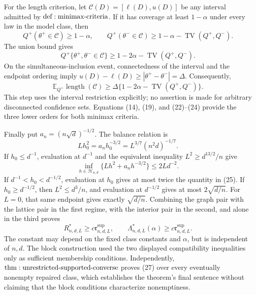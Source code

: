 For the length criterion, let \(\mathcal C(D)=[\ell(D),u(D)]\) be any interval admitted by \({\rm def:minimax\text{-}criteria}\).  If it has coverage at least \(1-\alpha\) under every law in the model class, then
\[
 Q^+(\theta^+\in\mathcal C)\geq1-\alpha,
 \qquad
 Q^+(\theta^-\in\mathcal C)
 \geq1-\alpha-\operatorname{TV}(Q^+,Q^-).
\]
The union bound gives
\[
 Q^+\{\theta^+,\theta^-\in\mathcal C\}
 \geq1-2\alpha-\operatorname{TV}(Q^+,Q^-).
\]
On the simultaneous-inclusion event, connectedness of the interval and the endpoint ordering imply \(u(D)-\ell(D)\geq|\theta^+-\theta^-|=\Delta\).  Consequently,
\[
 \mathbb E_{Q^+}\operatorname{length}(\mathcal C)
 \geq\Delta\{1-2\alpha-\operatorname{TV}(Q^+,Q^-)\}.
\tag{24}
\]
This step uses the interval restriction explicitly; no assertion is made for arbitrary disconnected confidence sets.  Equations (14), (19), and (22)--(24) provide the three lower orders for both minimax criteria.

Finally put \(a_n=(n\sqrt d)^{-1/2}\).  The balance relation is
\[
 Lh_0^2=a_nh_0^{-3/2}=L^{3/7}(n^2d)^{-1/7}.
\tag{25}
\]
If \(h_0\leq d^{-1}\), evaluation at \(d^{-1}\) and the equivalent inequality \(L^2\geq d^{13/2}/n\) give
\[
 \inf_{h\in\mathcal H_{n,d}}\{Lh^2+a_nh^{-3/2}\}\leq2Ld^{-2}.
\tag{26}
\]
If \(d^{-1}<h_0<d^{-1/2}\), evaluation at \(h_0\) gives at most twice the quantity in (25).  If \(h_0\geq d^{-1/2}\), then \(L^2\leq d^3/n\), and evaluation at \(d^{-1/2}\) gives at most \(2\sqrt{d/n}\).  For \(L=0\), that same endpoint gives exactly \(\sqrt{d/n}\).  Combining the graph pair with the lattice pair in the first regime, with the interior pair in the second, and alone in the third proves
\[
 R^*_{n,d,L}\geq c\mathfrak r^{\mathrm{sup}}_{n,d,L},
 \qquad \Lambda^*_{n,d,L}(\alpha)\geq c\mathfrak r^{\mathrm{sup}}_{n,d,L}.
\tag{27}
\]
The constant may depend on the fixed class constants and \(\alpha\), but is independent of \(n,d\).  The block construction used the two displayed compatibility inequalities only as sufficient membership conditions.  Independently, \({\rm thm:unrestricted\text{-}supported\text{-}converse}\) proves (27) over every eventually nonempty repaired class, which establishes the theorem's final sentence without claiming that the block conditions characterize nonemptiness.
